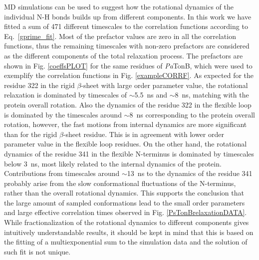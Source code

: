 \documentclass[pre,aps,floatfix,authordate1-4,twocolumn]{revtex4-1}
\begin{document}
MD simulations can be used to suggest how the rotational dynamics of the individual N-H bonds
builds up from different components. In this work we have fitted a sum of 471 different
timescales to the correlation functions according to Eq.~\ref{gprime_fit}.
Most of the prefactor values are zero in all the correlation functions,
thus the remaining timescales with non-zero prefactors are considered as the different
components of the total relaxation process.
The prefactors are shown in Fig. \ref{coeffsPLOT} for the same residues
of {\it Pa}TonB, which were used to exemplify the correlation functions in Fig. \ref{exampleCORRF}.
As expected for the residue 322 in the rigid $\beta$-sheet with large order parameter value,
the rotational relaxation is dominated by timescales of $\sim$5.5~ns and $\sim$8~ns,
matching with the protein overall
rotation. Also the dynamics of the residue 322 in the flexible loop is
dominated by the timescales around $\sim$8~ns corresponding to the protein overall rotation,
however, the fast motions from internal dynamics are more significant than for the
rigid $\beta$-sheet residue. This is in agreement with lower order parameter value
in the flexible loop residues. On the other hand, the rotational dynamics of
the residue 341 in the flexible N-terminus is dominated by timescales
below 3~ns, most likely related to the internal dynamics of the protein.
Contributions from timescales around $\sim$13~ns to the dynamics of the residue 341 probably
arise from the slow conformational fluctuations of the N-terminus, rather than the overall
rotational dynamics. This supports the conclusion that the large amount of sampled
conformations lead to the small order parameters and large effective correlation times
observed in Fig. \ref{PsTonBrelaxationDATA}.
While fractionalization of the rotational dynamics to different components
gives intuitively understandable results, it should be kept in mind that
this is based on the fitting of a multiexponential sum to the simulation data and the solution
of such fit is not unique.
\end{document}
